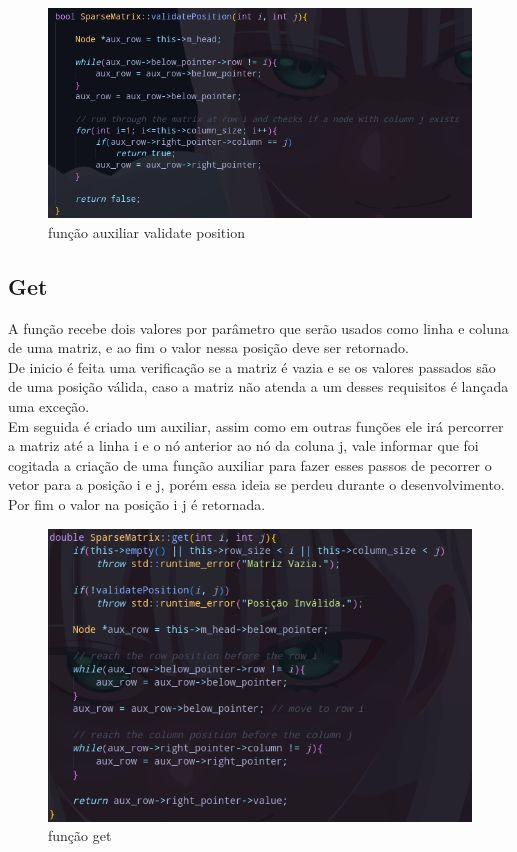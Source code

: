 \documentclass[a4paper,12pt]{article}
\begin{document}
\begin{figure}[H]
\centering
\includegraphics[width=1\textwidth]{Imagens/sparsematrixCPP/sparsematrix-validateposition.png}
\caption{\label{fig:validatepositon} função auxiliar validate position}
\end{figure}

\subsection{Get}
A função recebe dois valores por parâmetro que serão usados como linha e coluna de uma matriz, e ao fim o valor nessa posição deve ser retornado.\\
De inicio é feita uma verificação se a matriz é vazia e se os valores passados são de uma posição válida, caso a matriz não atenda a um desses requisitos é lançada uma exceção.\\
Em seguida é criado um auxiliar, assim como em outras funções ele irá percorrer a matriz até a linha i e o nó anterior ao nó da coluna j, vale informar que foi cogitada a criação de uma função auxiliar para fazer esses passos de pecorrer o vetor para a posição i e j, porém essa ideia se perdeu durante o desenvolvimento.\\
Por fim o valor na posição i j é retornada.

\begin{figure}[H]
    \centering
    \includegraphics[width=1\textwidth]{Imagens/sparsematrixCPP/sparsematrix-get.png}
    \caption{\label{fig:get} função get}
\end{figure}
\end{document}
